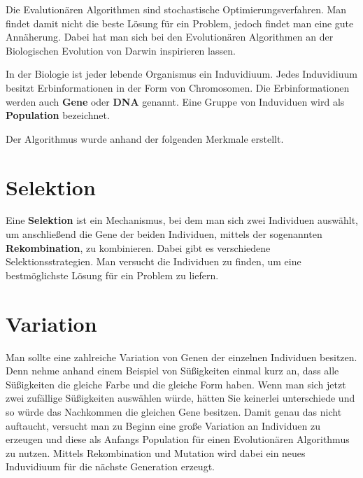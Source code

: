 
Die Evalutionären Algorithmen sind stochastische Optimierungsverfahren. Man findet damit nicht die beste Lösung für ein Problem, jedoch findet man eine gute Annäherung.
Dabei hat man sich bei den Evolutionären Algorithmen an der Biologischen Evolution von Darwin inspirieren lassen.

In der Biologie ist jeder lebende Organismus ein Induvidiuum.
Jedes Induvidiuum besitzt Erbinformationen in der Form von Chromosomen. Die Erbinformationen werden auch \textbf{Gene} oder \textbf{DNA} genannt.
Eine Gruppe von Induviduen wird als \textbf{Population} bezeichnet.

Der Algorithmus wurde anhand der folgenden Merkmale erstellt.

\section{Selektion}
\label{ch:Grundlagen:sec:Taktile Geräte:sec:Selektion}

Eine \textbf{Selektion} ist ein Mechanismus, bei dem man sich zwei Individuen auswählt, um anschließend die Gene der beiden Individuen, mittels der sogenannten \textbf{Rekombination}, zu kombinieren. Dabei gibt es verschiedene Selektionsstrategien. Man versucht die Individuen zu finden, um eine bestmöglichste Lösung für ein Problem zu liefern.

\section{Variation}
\label{ch:Grundlagen:sec:Taktile Geräte:sec:Variation}

Man sollte eine zahlreiche Variation von Genen der einzelnen Individuen besitzen. 
Denn nehme anhand einem Beispiel von Süßigkeiten einmal kurz an, dass alle Süßigkeiten die gleiche Farbe und die gleiche Form haben. Wenn man sich jetzt zwei zufällige Süßigkeiten auswählen würde, hätten Sie keinerlei unterschiede und so würde das Nachkommen die gleichen Gene besitzen. Damit genau das nicht auftaucht, versucht man zu Beginn eine große Variation an Individuen zu erzeugen und diese als Anfangs Population für einen Evolutionären Algorithmus zu nutzen. Mittels Rekombination und Mutation wird dabei ein neues Induvidiuum für die nächste Generation erzeugt. 


